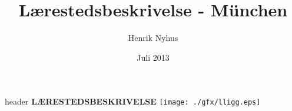 

\title{Lærestedsbeskrivelse - München}
\author{Henrik Nyhus}
\date{Juli 2013}



\begin{staticcontents*}{header}
\Huge{\MakeUppercase{\textbf{Lærestedsbeskrivelse}}} 
\hfill \texttt{[image: ./gfx/lligg.eps]}
\end{staticcontents*}












\clearpage
\tableofcontents
\label{lastpage}


